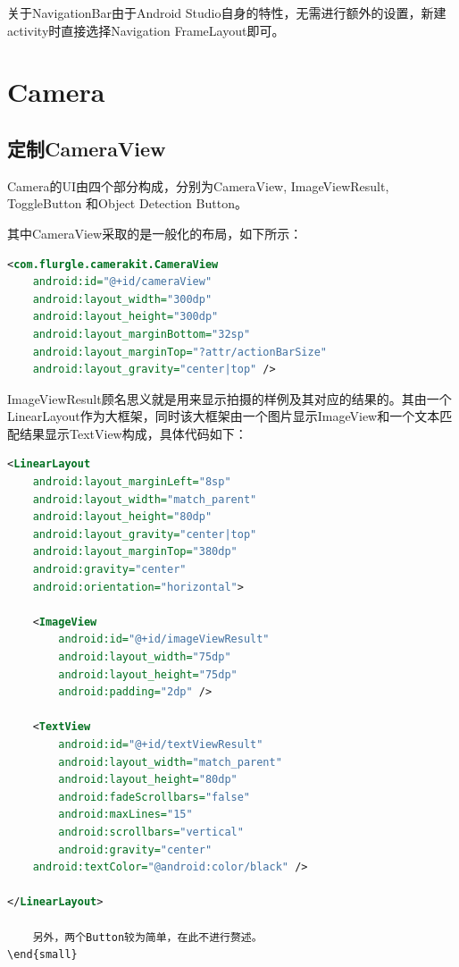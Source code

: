 \documentclass[UTF8, Microsoft YaHei]{book}
\begin{document}
	关于NavigationBar由于Android Studio自身的特性，无需进行额外的设置，新建activity时直接选择Navigation FrameLayout即可。

    \section{Camera}
    \subsection{定制CameraView}
    Camera的UI由四个部分构成，分别为CameraView, ImageViewResult, ToggleButton 和Object Detection Button。

    其中CameraView采取的是一般化的布局，如下所示：

\begin{small}
\begin{lstlisting}[language=xml]
<com.flurgle.camerakit.CameraView
    android:id="@+id/cameraView"
    android:layout_width="300dp"
    android:layout_height="300dp"
    android:layout_marginBottom="32sp"
    android:layout_marginTop="?attr/actionBarSize"
    android:layout_gravity="center|top" />
\end{lstlisting}
\end{small}

	ImageViewResult顾名思义就是用来显示拍摄的样例及其对应的结果的。其由一个LinearLayout作为大框架，同时该大框架由一个图片显示ImageView和一个文本匹配结果显示TextView构成，具体代码如下：

\begin{small}
\begin{lstlisting}[language=xml]
 <LinearLayout
    android:layout_marginLeft="8sp"
    android:layout_width="match_parent"
    android:layout_height="80dp"
    android:layout_gravity="center|top"
    android:layout_marginTop="380dp"
    android:gravity="center"
    android:orientation="horizontal">

    <ImageView
        android:id="@+id/imageViewResult"
        android:layout_width="75dp"
        android:layout_height="75dp"
        android:padding="2dp" />

    <TextView
        android:id="@+id/textViewResult"
        android:layout_width="match_parent"
        android:layout_height="80dp"
        android:fadeScrollbars="false"
        android:maxLines="15"
        android:scrollbars="vertical"
        android:gravity="center"
    android:textColor="@android:color/black" />

</LinearLayout>

	另外，两个Button较为简单，在此不进行赘述。
\end{small}
\end{lstlisting}
\end{small}
\end{document}
